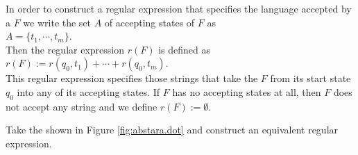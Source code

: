 In order to construct a regular expression that specifies the language accepted by a 
$F$ we write the set $A$ of accepting states of $F$ as
\\[0.2cm]
\hspace*{1.3cm}
$A = \{ t_1, \cdots, t_m \}$.
\\[0.2cm]
Then the regular expression $r(F)$ is defined as
\\[0.2cm]
\hspace*{1.3cm}
$r(F) := r(q_0, t_1) + \cdots + r(q_0, t_m)$.
\\[0.2cm]
This regular expression specifies those strings that take the  $F$ from its start state $q_0$ into
any of its accepting states.  If $F$ has no accepting states at all, then $F$ does not accept any string and
we define $r(F) := \emptyset$.
\eox


\exerciseEng
Take the  shown in Figure \ref{fig:abstara.dot} and construct an equivalent regular expression.


